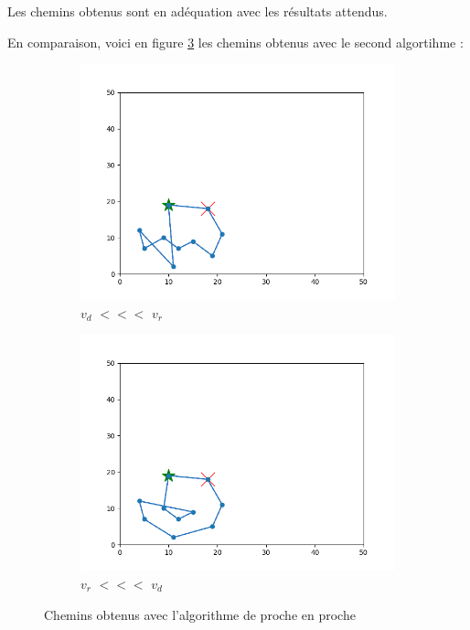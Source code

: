 \documentclass[12pt]{article}
\begin{document}
    Les chemins obtenus sont en adéquation avec les résultats attendus.

    \medskip

    En comparaison, voici en figure \ref{fig:terrain3close} les chemins obtenus avec le second algortihme :

    \begin{figure}[H]
      \centering
      \begin{subfigure}{0.35\textwidth}
        \centering
        \includegraphics[width=\linewidth]{img/3cd}
        \caption{$v_d$ $<<<$ $v_r$}
        \label{subfig:terrain3cd}
      \end{subfigure}
      \hfill
      \begin{subfigure}{0.35\textwidth}
        \centering
        \includegraphics[width=\linewidth]{img/3cr}
        \caption{$v_r$ $<<<$ $v_d$}
        \label{subfig:terrain3cr}
      \end{subfigure}
      \caption{Chemins obtenus avec l'algorithme de proche en proche}
      \label{fig:terrain3close}
  \end{figure}
\end{document}
